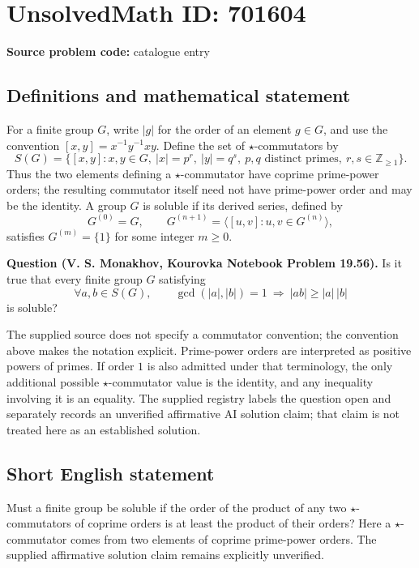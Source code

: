 \documentclass[11pt]{article}
\newcommand{\Z}{\mathbb{Z}}
\begin{document}
\section*{UnsolvedMath ID: 701604}
\textbf{Source problem code:} catalogue entry
\subsection{Definitions and mathematical statement}
For a finite group \(G\), write \(|g|\) for the order of an element \(g\in G\), and use the convention \([x,y]=x^{-1}y^{-1}xy\). Define the set of \(\star\)-commutators by
\[
S(G)=\bigl\{[x,y]:x,y\in G,\ |x|=p^r,\ |y|=q^s,\ p,q\text{ distinct primes},\ r,s\in\Z_{\geq 1}\bigr\}.
\]
Thus the two elements defining a \(\star\)-commutator have coprime prime-power orders; the resulting commutator itself need not have prime-power order and may be the identity. A group \(G\) is soluble if its derived series, defined by
\[
G^{(0)}=G,\qquad G^{(n+1)}=\langle [u,v]:u,v\in G^{(n)}\rangle,
\]
satisfies \(G^{(m)}=\{1\}\) for some integer \(m\geq 0\).

\textbf{Question (V. S. Monakhov, Kourovka Notebook Problem 19.56).} Is it true that every finite group \(G\) satisfying
\[
\forall a,b\in S(G),\qquad
\gcd(|a|,|b|)=1\ \Longrightarrow\ |ab|\geq |a|\,|b|
\]
is soluble?

The supplied source does not specify a commutator convention; the convention above makes the notation explicit. Prime-power orders are interpreted as positive powers of primes. If order \(1\) is also admitted under that terminology, the only additional possible \(\star\)-commutator value is the identity, and any inequality involving it is an equality. The supplied registry labels the question open and separately records an unverified affirmative AI solution claim; that claim is not treated here as an established solution.
\subsection{Short English statement}
Must a finite group be soluble if the order of the product of any two \(\star\)-commutators of coprime orders is at least the product of their orders? Here a \(\star\)-commutator comes from two elements of coprime prime-power orders. The supplied affirmative solution claim remains explicitly unverified.
\end{document}
